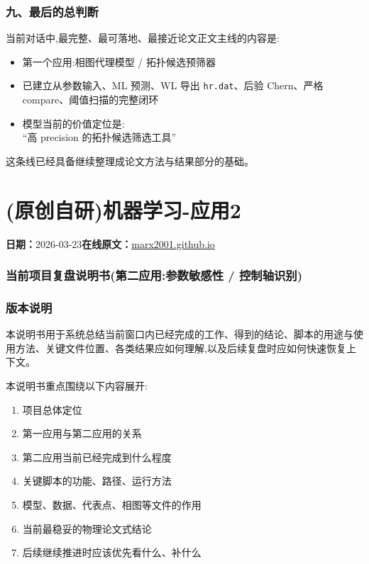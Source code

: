 \documentclass[lang=cn,scheme=chinese,color=blue,device=normal,toc=onecol,math=cm]{elegantbook}
\begin{document}
\subsubsection{九、最后的总判断}


当前对话中,最完整、最可落地、最接近论文正文主线的内容是:\par


\begin{itemize}
\item 第一个应用:相图代理模型 /\allowbreak{} 拓扑候选预筛器
\item 已建立从参数输入、ML 预测、WL 导出 \texttt{hr.dat}、后验 Chern、严格 compare、阈值扫描的完整闭环
\item 模型当前的价值定位是:\\ “高 precision 的拓扑候选筛选工具”
\end{itemize}


这条线已经具备继续整理成论文方法与结果部分的基础。\par



\section{(原创自研)机器学习-应用2}
\begin{articlemeta}
\textbf{日期：}2026-03-23\hfill\textbf{在线原文：}\href{https://marx2001.github.io/sci-note\_posts/20260323-ML5}{marx2001.github.io}
\end{articlemeta}

\subsubsection{当前项目复盘说明书(第二应用:参数敏感性 /\allowbreak{} 控制轴识别)}


\subsubsection{版本说明}


本说明书用于系统总结当前窗口内已经完成的工作、得到的结论、脚本的用途与使用方法、关键文件位置、各类结果应如何理解,以及后续复盘时应如何快速恢复上下文。\par


本说明书重点围绕以下内容展开:\par


\begin{enumerate}
\item 项目总体定位
\item 第一应用与第二应用的关系
\item 第二应用当前已经完成到什么程度
\item 关键脚本的功能、路径、运行方法
\item 模型、数据、代表点、相图等文件的作用
\item 当前最稳妥的物理论文式结论
\item 后续继续推进时应该优先看什么、补什么
\end{enumerate}
\end{document}
